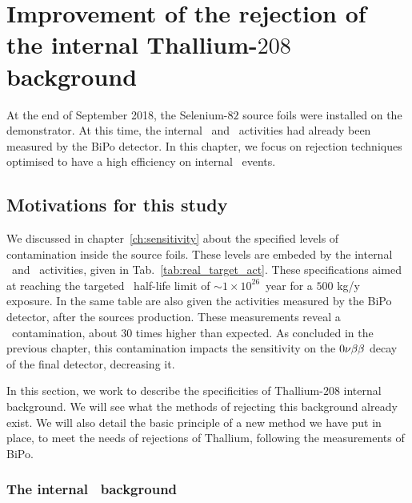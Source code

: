 \chapter{Improvement of the rejection of the internal Thallium-$208$ background}
\label{ch:timediff}

At the end of September 2018, the Selenium-$82$ source foils were installed on the demonstrator.
At this time, the internal \Tl\ and \Bi\ activities had already been measured by the BiPo detector.
In this chapter, we focus on rejection techniques optimised to have a high efficiency on internal \Tl\ events.



\section{Motivations for this study}

We discussed in chapter~\ref{ch:sensitivity} about the specified levels of contamination inside the source foils.
These levels are embeded by the internal \Bi\ and \Tl\ activities, given in Tab.~\ref{tab:real_target_act}.
These specifications aimed at reaching the targeted \Se\ half-life limit of $\sim1\times10^{26}$~year for a $500$ kg/y exposure.
In the same table are also given the activities measured by the BiPo detector, after the sources production.
These measurements reveal a \Tl\ contamination, about $30$ times higher than expected.
As concluded in the previous chapter, this contamination impacts the sensitivity on the $0\nu\beta\beta$ decay of the final detector, decreasing it.

In this section, we work to describe the specificities of Thallium-$208$ internal background.
We will see what the methods of rejecting this background already exist.
We will also detail the basic principle of a new method we have put in place, to meet the needs of rejections of Thallium, following the measurements of BiPo.

\subsection{The internal \Tl\ background}

